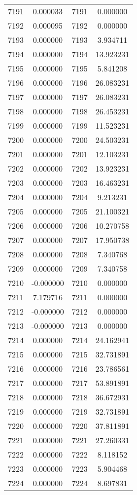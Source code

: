 \documentclass[12pt]{article}
\begin{document}
\begin{longtable}{@{}cccc@{}}
7191 & 0.000033 & 7191 & 0.000000 \\
7192 & 0.000095 & 7192 & 0.000000 \\
7193 & 0.000000 & 7193 & 3.934711 \\
7194 & 0.000000 & 7194 & 13.923231 \\
7195 & 0.000000 & 7195 & 5.841208 \\
7196 & 0.000000 & 7196 & 26.083231 \\
7197 & 0.000000 & 7197 & 26.083231 \\
7198 & 0.000000 & 7198 & 26.453231 \\
7199 & 0.000000 & 7199 & 11.523231 \\
7200 & 0.000000 & 7200 & 24.503231 \\
7201 & 0.000000 & 7201 & 12.103231 \\
7202 & 0.000000 & 7202 & 13.923231 \\
7203 & 0.000000 & 7203 & 16.463231 \\
7204 & 0.000000 & 7204 & 9.213231 \\
7205 & 0.000000 & 7205 & 21.100321 \\
7206 & 0.000000 & 7206 & 10.270758 \\
7207 & 0.000000 & 7207 & 17.950738 \\
7208 & 0.000000 & 7208 & 7.340768 \\
7209 & 0.000000 & 7209 & 7.340758 \\
7210 & -0.000000 & 7210 & 0.000000 \\
7211 & 7.179716 & 7211 & 0.000000 \\
7212 & -0.000000 & 7212 & 0.000000 \\
7213 & -0.000000 & 7213 & 0.000000 \\
7214 & 0.000000 & 7214 & 24.162941 \\
7215 & 0.000000 & 7215 & 32.731891 \\
7216 & 0.000000 & 7216 & 23.786561 \\
7217 & 0.000000 & 7217 & 53.891891 \\
7218 & 0.000000 & 7218 & 36.672931 \\
7219 & 0.000000 & 7219 & 32.731891 \\
7220 & 0.000000 & 7220 & 37.811891 \\
7221 & 0.000000 & 7221 & 27.260331 \\
7222 & 0.000000 & 7222 & 8.118152 \\
7223 & 0.000000 & 7223 & 5.904468 \\
7224 & 0.000000 & 7224 & 8.697831 \\

\end{longtable}
\end{document}
